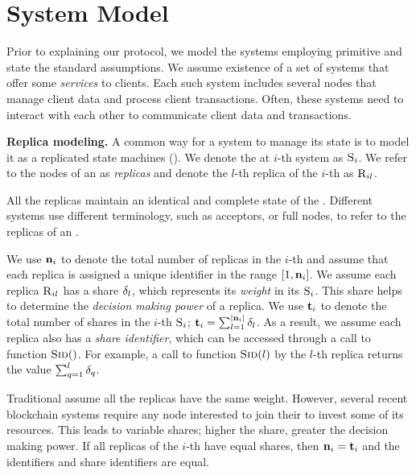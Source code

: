 \section{System Model}
\label{s:prelim}
Prior to explaining our \Scrooge{} protocol, we model the systems employing \CCC{} primitive 
and state the standard assumptions.
%
We assume existence of a set of systems that offer some {\em services} to clients.
Each such system includes several nodes that manage client data and process client transactions.
Often, these systems need to interact with each other to communicate client data and transactions.

{\bf Replica modeling.}
A common way for a system to manage its state is to model it as a replicated state machines (\RSM{}).
We denote the \RSM{} at $i$-th system as $\textsc{S}_{i}$. 
We refer to the nodes of an \RSM{} as {\em replicas} and 
denote the $l$-th replica of the $i$-th \RSM{} as $\textsc{R}_{{i}{l}}$.

\Ped{}
All the replicas maintain an identical and complete state of the \RSM{}. 
Different systems use different terminology, such as acceptors, or full nodes, to refer
to the replicas of an \RSM{}.

We use $\textbf{n}_{i}$ to denote the total number of replicas in the $i$-th \RSM{} 
and assume that each replica is assigned a unique identifier in the range $[1, \textbf{n}_{i}]$.
We assume each replica $\textsc{R}_{{i}{l}}$ has a share ${\delta}_{l}$, which represents its {\em weight} 
in its \RSM{} $\textsc{S}_{i}$.
This share helps to determine the {\em decision making power} of a replica.
We use $\textbf{t}_{i}$ to denote the total number of shares in the $i$-th \RSM{} $\textsc{S}_{i}$;
$\textbf{t}_{i} = \sum_{l=1}^{\lvert \textbf{n}_{i} \rvert} {\delta}_{l}$.
As a result, we assume each replica also has a {\em share identifier}, which 
can be accessed through a call to function $\textsc{Sid}({})$.
For example, a call to function $\textsc{Sid}({l})$ by the $l$-th replica returns the value 
$\sum_{q=1}^{l} {\delta}_{q}$.

\Ped{}
Traditional  assume all the replicas have the same weight. 
However, several recent blockchain systems require any node interested to join 
their \RSM{} to invest some of its resources. 
This leads to variable shares; higher the share, greater the decision making power.
If all replicas of the $i$-th \RSM{} have equal shares, then $\textbf{n}_{i} = \textbf{t}_{i}$ and
the \RSM{} identifiers and share identifiers are equal.




